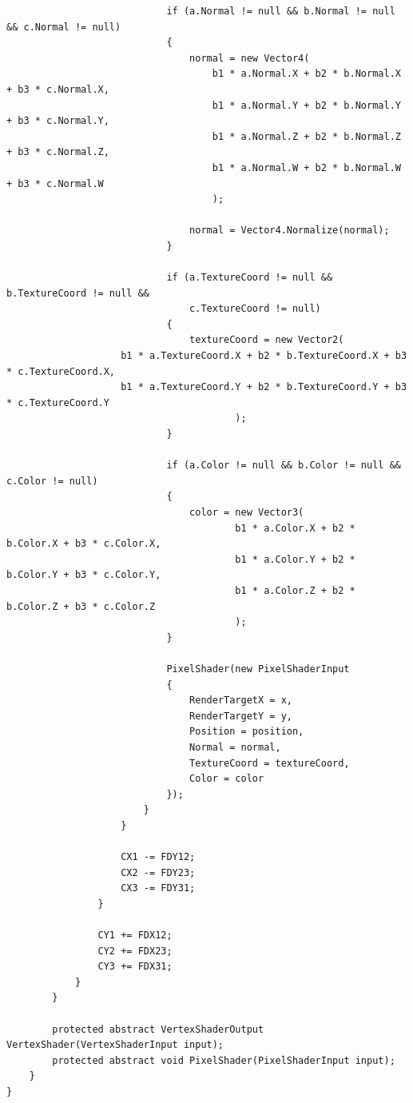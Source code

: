 \documentclass[a4paper,itemph,amsmath,oneside,11pt,openany]{xoblivoir}
\begin{document}
\begin{verbatim}
                            if (a.Normal != null && b.Normal != null && c.Normal != null)
                            {
                                normal = new Vector4(
                                    b1 * a.Normal.X + b2 * b.Normal.X + b3 * c.Normal.X,
                                    b1 * a.Normal.Y + b2 * b.Normal.Y + b3 * c.Normal.Y,
                                    b1 * a.Normal.Z + b2 * b.Normal.Z + b3 * c.Normal.Z,
                                    b1 * a.Normal.W + b2 * b.Normal.W + b3 * c.Normal.W
                                    );

                                normal = Vector4.Normalize(normal);
                            }

                            if (a.TextureCoord != null && b.TextureCoord != null &&
                                c.TextureCoord != null)
                            {
                                textureCoord = new Vector2(
                    b1 * a.TextureCoord.X + b2 * b.TextureCoord.X + b3 * c.TextureCoord.X,
                    b1 * a.TextureCoord.Y + b2 * b.TextureCoord.Y + b3 * c.TextureCoord.Y
                                        );
                            }

                            if (a.Color != null && b.Color != null && c.Color != null)
                            {
                                color = new Vector3(
                                        b1 * a.Color.X + b2 * b.Color.X + b3 * c.Color.X,
                                        b1 * a.Color.Y + b2 * b.Color.Y + b3 * c.Color.Y,
                                        b1 * a.Color.Z + b2 * b.Color.Z + b3 * c.Color.Z
                                        );
                            }

                            PixelShader(new PixelShaderInput
                            {
                                RenderTargetX = x,
                                RenderTargetY = y,
                                Position = position,
                                Normal = normal,
                                TextureCoord = textureCoord,
                                Color = color
                            });
                        }
                    }

                    CX1 -= FDY12;
                    CX2 -= FDY23;
                    CX3 -= FDY31;
                }

                CY1 += FDX12;
                CY2 += FDX23;
                CY3 += FDX31;
            }
        }

        protected abstract VertexShaderOutput VertexShader(VertexShaderInput input);
        protected abstract void PixelShader(PixelShaderInput input);
    }
}

\end{verbatim}
\end{document}
